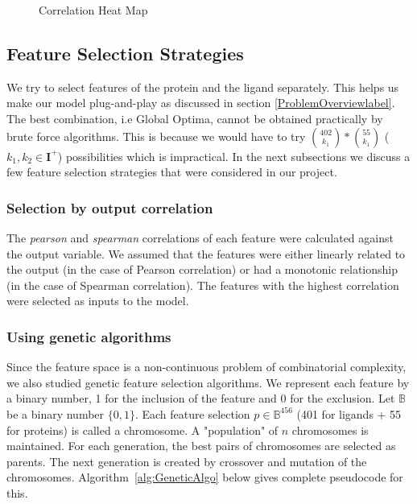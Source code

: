 \documentclass[11pt]{article}
\begin{document}
\begin{figure}[htb]
\begin{subfigure}[b]{0.45\textwidth}
        \label{fig:correlationfr}
     \end{subfigure}
     \caption{Correlation Heat Map}
     \label{fig:correlationheatmap}
\end{figure}

\subsection{Feature Selection Strategies}


We try to select features of the protein and the ligand separately.
This helps us make our model plug-and-play as discussed in section \ref{ProblemOverviewlabel}.
The best combination,  i.e Global Optima,  cannot be obtained practically by brute force algorithms.
This is because we would have to try $\binom{402}{k_1} * \binom{55}{k_1}$ ($k_1, k_2 \in \mathbf{I}^+$) possibilities which is impractical.
In the next subsections we discuss a few feature selection strategies that were considered in our project.

\subsubsection{Selection by output correlation}
The \textit{pearson} and \textit{spearman} correlations of each feature were calculated against the output variable.
We assumed that the features were either linearly related to the output (in the case of Pearson correlation) or had a monotonic relationship (in the case of Spearman correlation).
The features with the highest correlation were selected as inputs to the model.

\subsubsection{Using genetic algorithms \cite{genetic_algorithm}}
Since the feature space is a non-continuous problem of combinatorial complexity,
we also studied genetic feature selection algorithms.
We represent each feature by a binary number, 1 for the inclusion of the feature and 0 for the exclusion.
Let $\mathbb{B}$ be a binary number $\{0,  1\}$.
Each feature selection $p \in \mathbb{B}^{456}$ (401 for ligands + 55 for proteins) is called a chromosome.
A "population" of $n$ chromosomes is maintained.
For each generation,  the best pairs of chromosomes are selected as parents.
The next generation is created by crossover and mutation of the chromosomes.
Algorithm~\ref{alg:GeneticAlgo} below gives complete pseudocode for this.
\end{document}
